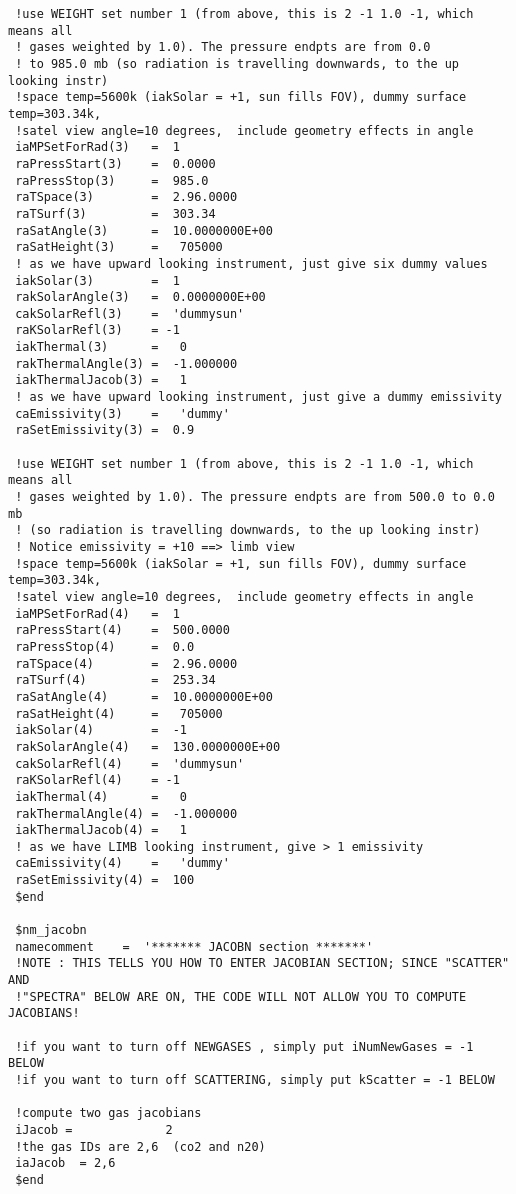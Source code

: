 \documentclass[12pt]{article}
\begin{document}
\begin{scriptsize}
\begin{verbatim}
 !use WEIGHT set number 1 (from above, this is 2 -1 1.0 -1, which means all 
 ! gases weighted by 1.0). The pressure endpts are from 0.0
 ! to 985.0 mb (so radiation is travelling downwards, to the up looking instr)
 !space temp=5600k (iakSolar = +1, sun fills FOV), dummy surface temp=303.34k, 
 !satel view angle=10 degrees,  include geometry effects in angle
 iaMPSetForRad(3)   =  1
 raPressStart(3)    =  0.0000
 raPressStop(3)     =  985.0
 raTSpace(3)        =  2.96.0000
 raTSurf(3)         =  303.34
 raSatAngle(3)      =  10.0000000E+00
 raSatHeight(3)     =   705000
 ! as we have upward looking instrument, just give six dummy values
 iakSolar(3)        =  1
 rakSolarAngle(3)   =  0.0000000E+00
 cakSolarRefl(3)    =  'dummysun'
 raKSolarRefl(3)    = -1
 iakThermal(3)      =   0
 rakThermalAngle(3) =  -1.000000
 iakThermalJacob(3) =   1
 ! as we have upward looking instrument, just give a dummy emissivity
 caEmissivity(3)    =   'dummy'
 raSetEmissivity(3) =  0.9

 !use WEIGHT set number 1 (from above, this is 2 -1 1.0 -1, which means all 
 ! gases weighted by 1.0). The pressure endpts are from 500.0 to 0.0 mb
 ! (so radiation is travelling downwards, to the up looking instr)
 ! Notice emissivity = +10 ==> limb view
 !space temp=5600k (iakSolar = +1, sun fills FOV), dummy surface temp=303.34k, 
 !satel view angle=10 degrees,  include geometry effects in angle
 iaMPSetForRad(4)   =  1
 raPressStart(4)    =  500.0000
 raPressStop(4)     =  0.0
 raTSpace(4)        =  2.96.0000
 raTSurf(4)         =  253.34
 raSatAngle(4)      =  10.0000000E+00
 raSatHeight(4)     =   705000
 iakSolar(4)        =  -1
 rakSolarAngle(4)   =  130.0000000E+00
 cakSolarRefl(4)    =  'dummysun'
 raKSolarRefl(4)    = -1
 iakThermal(4)      =   0
 rakThermalAngle(4) =  -1.000000
 iakThermalJacob(4) =   1
 ! as we have LIMB looking instrument, give > 1 emissivity
 caEmissivity(4)    =   'dummy'
 raSetEmissivity(4) =  100
 $end

 $nm_jacobn
 namecomment    =  '******* JACOBN section *******'
 !NOTE : THIS TELLS YOU HOW TO ENTER JACOBIAN SECTION; SINCE "SCATTER" AND
 !"SPECTRA" BELOW ARE ON, THE CODE WILL NOT ALLOW YOU TO COMPUTE JACOBIANS!

 !if you want to turn off NEWGASES , simply put iNumNewGases = -1 BELOW
 !if you want to turn off SCATTERING, simply put kScatter = -1 BELOW

 !compute two gas jacobians
 iJacob =             2
 !the gas IDs are 2,6  (co2 and n20)
 iaJacob  = 2,6
 $end


\end{verbatim}
\end{scriptsize}
\end{document}
